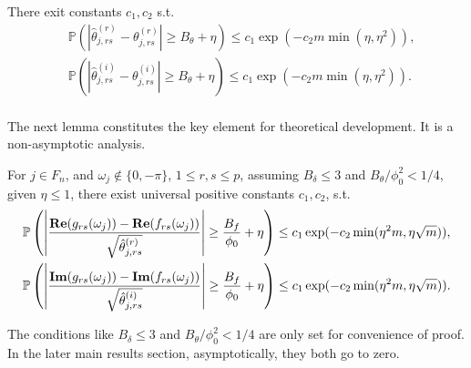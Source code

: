\begin{lem}
\label{lemma: deviation_variance}
There exit constants $c_1, c_2$ s.t.
\begin{equation}
\begin{aligned}
& \mathbb{P}\left(\left|\hat{\theta}^{(r)}_{j, rs} - \theta^{(r)}_{j, rs}\right|\ge  
B_\theta + \eta \right) \le  c_1\exp(-c_2m\min\left(\eta, \eta^2\right)), \\ 
& \mathbb{P}\left(\left|\hat{\theta}^{(i)}_{j, rs} - \theta^{(i)}_{j, rs}\right|\ge  
B_\theta + \eta \right) \le  c_1\exp(-c_2m\min\left(\eta, \eta^2\right)).\\ 
\end{aligned}
\end{equation}
\end{lem}
The next lemma constitutes the key element for theoretical development. It is a non-asymptotic analysis. 
\begin{lem}
For $j\in F_n$, and $\omega_j \notin \{0, -\pi\}$,  $1\le r, s\le p$, 
assuming $B_\delta\le 3$ and $B_\theta/\phi_0^2<1/4$, given $\eta\le 1$, there exist universal positive constants $c_1, c_2$, s.t. 
\begin{equation}
\begin{aligned}
& \mathbb{P}\left(\left|\frac{{\bf Re}(g_{rs}(\omega_j)) - {\bf Re}(f_{rs}(\omega_j))}{\sqrt{\hat{\theta}^{(r)}_{j,rs}}}\right| \ge \frac{B_f}{\phi_0}+\eta\right)\le c_1\exp(-c_2\min(\eta^2 m, \eta \sqrt{m})),\\
& \mathbb{P}\left(\left|\frac{{\bf Im}(g_{rs}(\omega_j)) - {\bf Im}(f_{rs}(\omega_j))}{\sqrt{\hat{\theta}^{(i)}_{j,rs}}}\right| \ge \frac{B_f}{\phi_0}+\eta\right)\le c_1\exp(-c_2\min(\eta^2 m, \eta \sqrt{m})).
\end{aligned}
\end{equation}
\end{lem}
\begin{remark}
The conditions like $B_\delta\le 3$ and $B_\theta/\phi_0^2<1/4$ are only set for convenience of proof. In the later main results section, asymptotically, they both go to zero. 
\end{remark}

